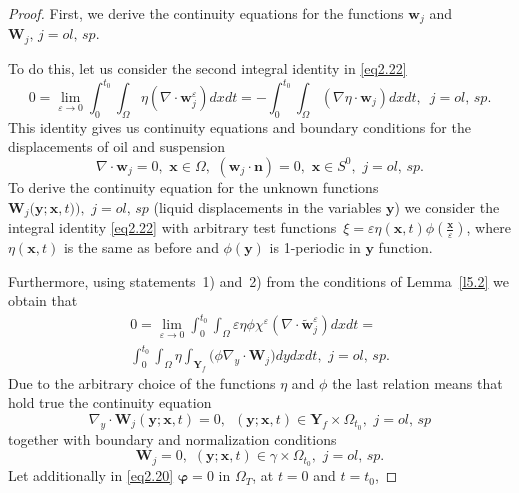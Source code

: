 \documentclass[10pt,a4paper]{amsart}
\begin{document}
\begin{proof}
First, we derive the continuity equations for the functions $\boldsymbol{w}_{j}$ and $\boldsymbol{W}_{j},\,j=ol,\,sp.$

To do this, let us consider the second integral identity in \eqref{eq2.22}
\begin{equation*}
0=\lim_{\varepsilon\rightarrow{0}}\int_{0}^{{t}_{0}}
\int_{\Omega}{\eta}(\nabla\cdot\boldsymbol{w}^{\varepsilon}_{j})dxdt=
-\int_{0}^{{t}_{0}}\int_{\Omega}(\nabla{\eta}\cdot\boldsymbol{w}_{j})dxdt,\,\,\,j=ol,\,sp.
\end{equation*}
This identity gives us continuity equations and boundary conditions for the displacements of oil and suspension
\begin{equation}\label{eq5.5}
\nabla\cdot\boldsymbol{w}_{j}=0,\,\,\boldsymbol{x}\in\Omega,\,\,(\boldsymbol{w}_{j}\cdot\boldsymbol{n})=0, \,\,\boldsymbol{x}\in{S}^{0},\,\,j=ol,\,sp.
\end{equation}
To derive the continuity equation for the unknown functions
$\boldsymbol{W}_{j}\big(\boldsymbol{y};\boldsymbol{x},t)\big),\,\,j=ol,\,sp$
(liquid displacements in the variables $\boldsymbol{y}$) we consider the integral identity \eqref{eq2.22} with arbitrary test functions $\displaystyle\,{\xi}=\varepsilon{\eta}(\boldsymbol{x},t)\phi(\frac{\boldsymbol{x}}{\varepsilon})$, where ${\eta}(\boldsymbol{x},t)$ is the same as before and $\phi(\boldsymbol{y})$ is 1-periodic in $\boldsymbol{y}$ function.

Furthermore, using statements~1) and~2) from the conditions of Lemma~\ref{l5.2} we obtain that
\begin{multline}\label{eq5.6}
0=\lim_{\varepsilon\rightarrow{0}}\int_{0}^{{t}_{0}}
\int_{\Omega}\varepsilon{\eta}\phi\chi^{\varepsilon}
(\nabla\cdot\widetilde{\boldsymbol{w}}_{j}^{\varepsilon})dxdt=
\\
\int_{0}^{{t}_{0}}\int_{\Omega}{\eta}\int_{\textbf{Y}_{f}}
\big(\phi\nabla_{y}\cdot\boldsymbol{W}_{j}\big)dydxdt,\,\,j=ol,\,sp.
\end{multline}
Due to the arbitrary choice of the functions ${\eta}$ and $\phi$ the last relation means that hold true the
continuity equation
\begin{equation}\label{eq5.7}
\nabla_{y}\cdot\boldsymbol{W}_{j}(\boldsymbol{y};\boldsymbol{x},t)=0,\,\,\,
(\boldsymbol{y};\boldsymbol{x},t)\in\textbf{Y}_{f}\times\Omega_{t_{0}},\,\,j=ol,\,sp
\end{equation}
together with boundary and normalization conditions
\begin{equation}\label{eq5.8}
\boldsymbol{W}_{j}=0,\,\,(\boldsymbol{y};\boldsymbol{x},t)\in\gamma\times\Omega_{t_{0}},\,\,j=ol,\,sp.
\end{equation}
Let additionally in \eqref{eq2.20} $\boldsymbol{\varphi}=0$ in $\Omega_{T}$, at $t=0$ and $t=t_{0}$,


\end{proof}
\end{document}
